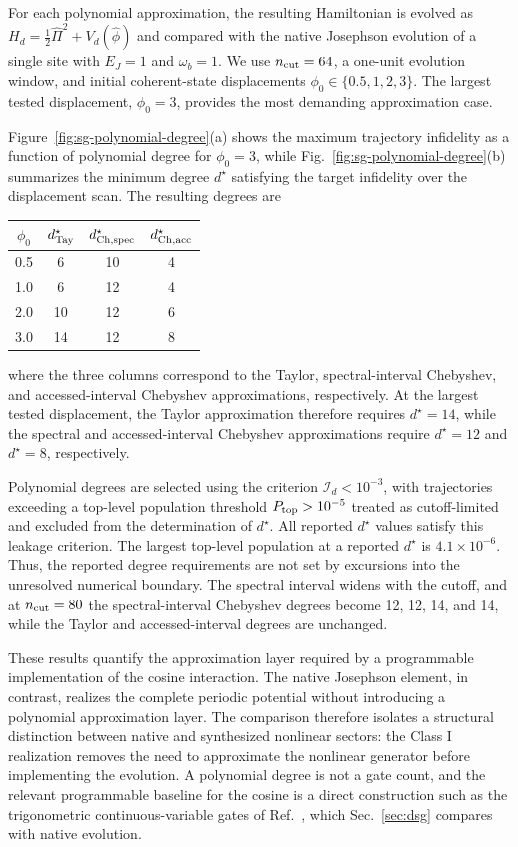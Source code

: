 \documentclass[pra,twocolumn,superscriptaddress,nofootinbib,floatfix]{revtex4-2}
\theoremstyle{remark}
\newcommand{\revcolor}{\color{blue}}
\DeclareRobustCommand{\rev}[1]{{\revcolor #1}}
\begin{document}
\rev{For each polynomial approximation, the resulting Hamiltonian is evolved as \(H_d=\frac12\hat\Pi^2+V_d(\hat\phi)\) and compared with the native Josephson evolution of a single site with \(E_J=1\) and \(\omega_b=1\).} We use \(n_{\rm cut}=64\), a one-unit evolution window, and initial coherent-state displacements \(\phi_0\in\{0.5,1,2,3\}.\) The largest tested displacement, \(\phi_0=3\), provides the most demanding approximation case.

Figure~\ref{fig:sg-polynomial-degree}(a) shows the maximum trajectory infidelity as a function of polynomial degree for \(\phi_0=3\), while Fig.~\ref{fig:sg-polynomial-degree}(b) summarizes the minimum degree \(d^\star\) satisfying the target infidelity over the displacement scan. The resulting degrees are
\begin{center}
\begin{tabular}{c|ccc}
\(\phi_0\) & \(d_{\rm Tay}^{\star}\) & \(d_{\rm Ch,spec}^{\star}\) & \(d_{\rm Ch,acc}^{\star}\) \\
\hline
0.5 & 6 & 10 & 4 \\
1.0 & 6 & 12 & 4 \\
2.0 & 10 & 12 & 6 \\
3.0 & 14 & 12 & 8
\end{tabular}
\end{center}
where the three columns correspond to the Taylor, spectral-interval Chebyshev, and accessed-interval Chebyshev approximations, respectively. At the largest tested displacement, the Taylor approximation therefore requires \(d^\star=14\), while the spectral and accessed-interval Chebyshev approximations require \(d^\star=12\) and \(d^\star=8\), respectively.

Polynomial degrees are selected using the criterion \(\mathcal I_d<10^{-3}\), with trajectories exceeding a top-level population threshold \(P_{\rm top}>10^{-5}\) treated as cutoff-limited and excluded from the determination of \(d^\star\). All reported \(d^\star\) values satisfy this leakage criterion. \rev{The largest top-level population at a reported \(d^\star\) is \(4.1\times10^{-6}\).} Thus, the reported degree requirements are not set by excursions into the unresolved numerical boundary. \rev{The spectral interval widens with the cutoff, and at \(n_{\rm cut}=80\) the spectral-interval Chebyshev degrees become 12, 12, 14, and 14, while the Taylor and accessed-interval degrees are unchanged.}

These results quantify the approximation layer required by a programmable implementation of the cosine interaction. The native Josephson element, in contrast, realizes the complete periodic potential without introducing a polynomial approximation layer. The comparison therefore isolates a structural distinction between native and synthesized nonlinear sectors: the Class I realization removes the need to approximate the nonlinear generator before implementing the evolution. \rev{A polynomial degree is not a gate count, and the relevant programmable baseline for the cosine is a direct construction such as the trigonometric continuous-variable gates of Ref.~\cite{Rainaldi2026TrigonometricCV}, which Sec.~\ref{sec:dsg} compares with native evolution.}
\end{document}
